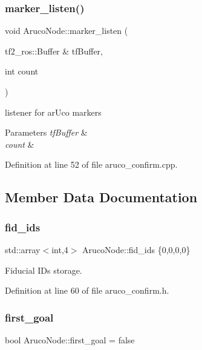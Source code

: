 \subsubsection{\texorpdfstring{marker\+\_\+listen()}{marker\_listen()}}
{\footnotesize\ttfamily void Aruco\+Node\+::marker\+\_\+listen (\begin{DoxyParamCaption}\item[{tf2\+\_\+ros\+::\+Buffer \&}]{tf\+Buffer,  }\item[{int}]{count }\end{DoxyParamCaption})}



listener for ar\+Uco markers 


\begin{DoxyParams}{Parameters}
{\em tf\+Buffer} & \\
\hline
{\em count} & \\
\hline
\end{DoxyParams}


Definition at line 52 of file aruco\+\_\+confirm.\+cpp.



\subsection{Member Data Documentation}
\mbox{\label{class_aruco_node_aa64bc8aad47d7569e315f5045ecaa7ac}} 
\subsubsection{\texorpdfstring{fid\+\_\+ids}{fid\_ids}}
{\footnotesize\ttfamily std\+::array$<$int,4$>$ Aruco\+Node\+::fid\+\_\+ids \{0,0,0,0\}}



Fiducial I\+Ds storage. 



Definition at line 60 of file aruco\+\_\+confirm.\+h.

\mbox{\label{class_aruco_node_a323a2a97fc30a4e6daf59d9577485569}} 
\subsubsection{\texorpdfstring{first\+\_\+goal}{first\_goal}}
{\footnotesize\ttfamily bool Aruco\+Node\+::first\+\_\+goal = false}



